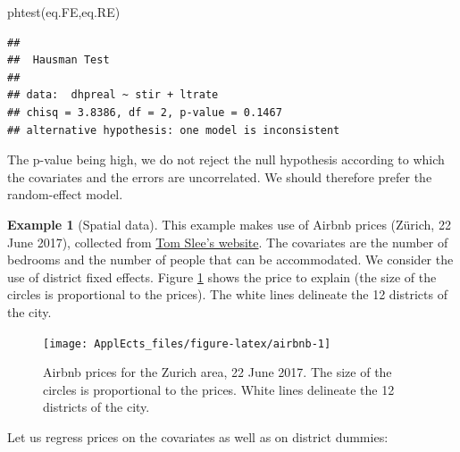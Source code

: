 \documentclass[
  12pt,
]{book}
\newenvironment{Shaded}{\begin{snugshade}}{\end{snugshade}}
\newcommand{\FunctionTok}[1]{\textcolor[rgb]{0.00,0.00,0.00}{#1}}
\newcommand{\NormalTok}[1]{#1}
\theoremstyle{definition}
\theoremstyle{definition}
\newtheorem{example}{Example}[chapter]
\theoremstyle{definition}
\theoremstyle{definition}
\theoremstyle{remark}
\begin{document}
\begin{Shaded}
\begin{Highlighting}[]
\FunctionTok{phtest}\NormalTok{(eq.FE,eq.RE)}
\end{Highlighting}
\end{Shaded}

\begin{verbatim}
## 
##  Hausman Test
## 
## data:  dhpreal ~ stir + ltrate
## chisq = 3.8386, df = 2, p-value = 0.1467
## alternative hypothesis: one model is inconsistent
\end{verbatim}

The p-value being high, we do not reject the null hypothesis according to which the covariates and the errors are uncorrelated. We should therefore prefer the random-effect model.

\begin{example}[Spatial data]
\protect\hypertarget{exm:airbnb}{}\label{exm:airbnb}This example makes use of Airbnb prices (Zürich, 22 June 2017), collected from \href{http://tomslee.net/airbnb-data-collection-get-the-data}{Tom Slee's website}. The covariates are the number of bedrooms and the number of people that can be accommodated. We consider the use of district fixed effects. Figure \ref{fig:airbnb} shows the price to explain (the size of the circles is proportional to the prices). The white lines delineate the 12 districts of the city.

\begin{figure}
\texttt{[image: ApplEcts\_files/figure-latex/airbnb-1]} \caption{Airbnb prices for the Zurich area, 22 June 2017. The size of the circles is proportional to the prices. White lines delineate the 12 districts of the city.}\label{fig:airbnb}
\end{figure}

Let us regress prices on the covariates as well as on district dummies:


\end{example}
\end{document}
